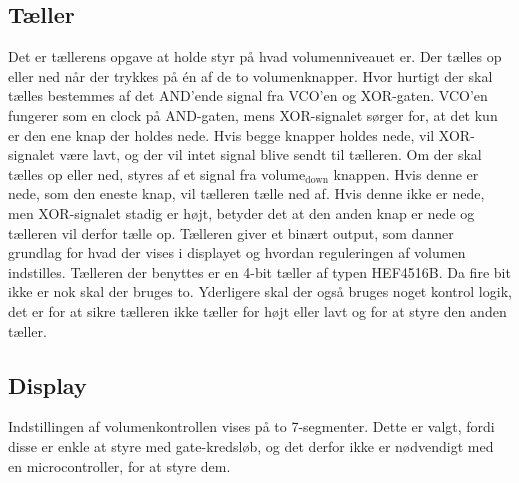 \subsection*{Tæller}
\label{volumenkontrol-simulering-taeller}

Det er tællerens opgave at holde styr på hvad volumenniveauet er. Der tælles op eller ned når der trykkes på én af de to volumenknapper. Hvor hurtigt der skal tælles bestemmes af det AND'ende signal fra VCO'en og XOR-gaten. VCO'en fungerer som en clock på AND-gaten, mens XOR-signalet sørger for, at det kun er den ene knap der holdes nede. Hvis begge knapper holdes nede, vil XOR-signalet være lavt, og der vil intet signal blive sendt til tælleren. Om der skal tælles op eller ned, styres af et signal fra $\mathrm{volume_{down}}$ knappen. Hvis denne er nede, som den eneste knap, vil tælleren tælle ned af. Hvis denne ikke er nede, men XOR-signalet stadig er højt, betyder det at den anden knap er nede og tælleren vil derfor tælle op. Tælleren giver et binært output, som danner grundlag for hvad der vises i displayet og hvordan reguleringen af volumen indstilles. Tælleren der benyttes er en 4-bit tæller af typen HEF4516B. Da fire bit ikke er nok skal der bruges to. Yderligere skal der også bruges noget kontrol logik, det er for at sikre tælleren ikke tæller for højt eller lavt og for at styre den anden tæller.

\subsection*{Display}
\label{volumenkontrol-simulering-display}
Indstillingen af volumenkontrollen vises på to 7-segmenter. Dette er valgt, fordi disse er enkle at styre med gate-kredsløb, og det derfor ikke er nødvendigt med en microcontroller, for at styre dem. 

